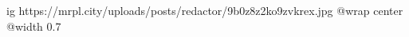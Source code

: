  
 
 
 
 

\ifcmt
  ig https://mrpl.city/uploads/posts/redactor/9b0z8z2ko9zvkrex.jpg
  @wrap center
  @width 0.7
\fi

